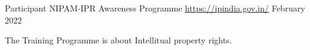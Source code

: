 \begin{cventries}
  \cventry
  {Participant}
    {NIPAM-IPR Awareness Programme}
    {\href{https://ipindiaservices.gov.in/RQStatus/IPR_EVENT.aspx?FileName=QmF0Y2gyL01yLlNBR0FSVkVEQkFJUldBMjM2MDI4LnBkZg==}{https://ipindia.gov.in/}}
    {February 2022}
   { \begin{cvitems}
         \item {The Training Programme is about Intellitual property rights.}
    \end{cvitems}
  }
  
    
\end{cventries}
\vspace{-3mm}
